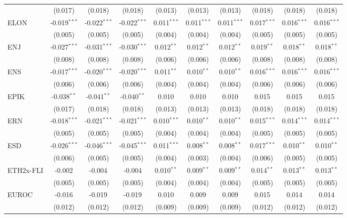 \begin{table}[!htbp]
\begin{tabular}{@{\extracolsep{5pt}}lccccccccc}
  & (0.017) & (0.018) & (0.018) & (0.013) & (0.013) & (0.013) & (0.018) & (0.018) & (0.018) \\
 ELON & -0.019$^{***}$ & -0.022$^{***}$ & -0.022$^{***}$ & 0.011$^{***}$ & 0.011$^{***}$ & 0.011$^{***}$ & 0.017$^{***}$ & 0.016$^{***}$ & 0.016$^{***}$ \\
  & (0.005) & (0.005) & (0.005) & (0.004) & (0.004) & (0.004) & (0.005) & (0.005) & (0.005) \\
 ENJ & -0.027$^{***}$ & -0.031$^{***}$ & -0.030$^{***}$ & 0.012$^{**}$ & 0.012$^{**}$ & 0.012$^{**}$ & 0.019$^{**}$ & 0.018$^{**}$ & 0.018$^{**}$ \\
  & (0.008) & (0.008) & (0.008) & (0.006) & (0.006) & (0.006) & (0.008) & (0.008) & (0.008) \\
 ENS & -0.017$^{***}$ & -0.020$^{***}$ & -0.020$^{***}$ & 0.011$^{**}$ & 0.010$^{**}$ & 0.010$^{**}$ & 0.016$^{***}$ & 0.016$^{***}$ & 0.016$^{***}$ \\
  & (0.006) & (0.006) & (0.006) & (0.004) & (0.004) & (0.004) & (0.006) & (0.006) & (0.006) \\
 EPIK & -0.038$^{**}$ & -0.041$^{**}$ & -0.040$^{**}$ & 0.010$^{}$ & 0.010$^{}$ & 0.010$^{}$ & 0.015$^{}$ & 0.015$^{}$ & 0.015$^{}$ \\
  & (0.017) & (0.018) & (0.018) & (0.013) & (0.013) & (0.013) & (0.018) & (0.018) & (0.018) \\
 ERN & -0.018$^{***}$ & -0.021$^{***}$ & -0.021$^{***}$ & 0.010$^{***}$ & 0.010$^{**}$ & 0.010$^{**}$ & 0.015$^{***}$ & 0.014$^{***}$ & 0.014$^{***}$ \\
  & (0.005) & (0.005) & (0.005) & (0.004) & (0.004) & (0.004) & (0.005) & (0.005) & (0.005) \\
 ESD & -0.026$^{***}$ & -0.046$^{***}$ & -0.045$^{***}$ & 0.011$^{***}$ & 0.008$^{**}$ & 0.008$^{**}$ & 0.017$^{***}$ & 0.010$^{**}$ & 0.010$^{**}$ \\
  & (0.006) & (0.005) & (0.005) & (0.004) & (0.003) & (0.004) & (0.006) & (0.005) & (0.005) \\
 ETH2x-FLI & -0.002$^{}$ & -0.004$^{}$ & -0.004$^{}$ & 0.010$^{**}$ & 0.009$^{**}$ & 0.009$^{**}$ & 0.014$^{**}$ & 0.013$^{**}$ & 0.013$^{**}$ \\
  & (0.005) & (0.005) & (0.005) & (0.004) & (0.004) & (0.004) & (0.005) & (0.005) & (0.005) \\
 EUROC & -0.016$^{}$ & -0.019$^{}$ & -0.019$^{}$ & 0.010$^{}$ & 0.009$^{}$ & 0.009$^{}$ & 0.015$^{}$ & 0.014$^{}$ & 0.014$^{}$ \\
  & (0.012) & (0.012) & (0.012) & (0.009) & (0.009) & (0.009) & (0.012) & (0.012) & (0.012) \\

\end{tabular}
\end{table}
